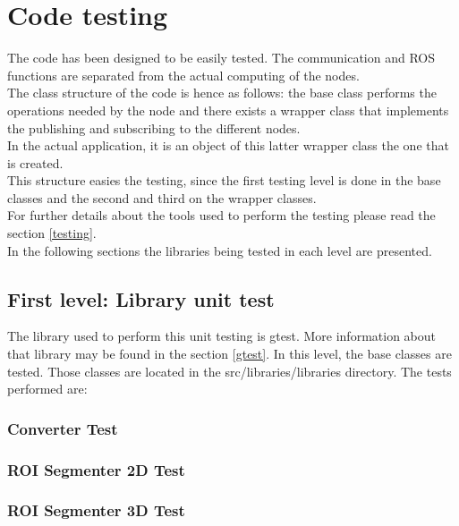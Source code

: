 \section{Code testing}
The code has been designed to be easily tested. The communication and ROS functions are separated from the actual computing of the nodes. 
\\

The class structure of the code is hence as follows: the base class performs the operations needed by the node and there exists a wrapper class that implements the publishing and subscribing to the different nodes. \\

In the actual application, it is an object of this latter wrapper class the one that is created. 
\\

This structure easies the testing, since the first testing level is done in the base classes and the second and third on the wrapper classes.
\\

For further details about the tools used to perform the testing please read the section \ref{testing}.
\\

In the following sections the libraries being tested in each level are presented. 

	\subsection{First level: Library unit test}
		The library used to perform this unit testing is gtest. More information about that library may be found in the section \ref{gtest}.
		In this level, the base classes are tested. Those classes are located in the src/libraries/libraries directory. The tests performed are: 
			\subsubsection{Converter Test}

			\subsubsection{ROI Segmenter 2D Test}

			\subsubsection{ROI Segmenter 3D Test}

